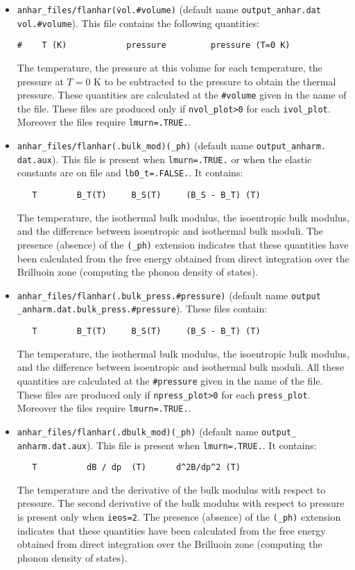 \documentclass[12pt,a4paper,twoside]{report}
\begin{document}
\begin{itemize}
\item
\texttt{anhar\_files/flanhar(\.vol.\#volume)} (default name \texttt{output\_anhar.dat} \texttt{vol.\#volume}).
This file contains the following quantities:
\begin{verbatim}
#    T (K)            pressure         pressure (T=0 K) 
\end{verbatim}
The temperature, the pressure at this volume for each temperature, the
pressure at $T=0$ K to be subtracted to the pressure to obtain the
thermal pressure.
These quantities are calculated at the \texttt{\#volume} given in the name 
of the file.
These files are produced only if \texttt{nvol\_plot>0} for each
\texttt{ivol\_plot}. Moreover the files require \texttt{lmurn=.TRUE.}.

\item \texttt{anhar\_files/flanhar(.bulk\_mod)(\_ph)} 
(default name \texttt{output\_anharm.} \texttt{dat.aux}).
This file is present when \texttt{lmurn=.TRUE.} or when the elastic
constants are on file and \texttt{lb0\_t=.FALSE.}. It contains:
\begin{verbatim}
   T        B_T(T)     B_S(T)     (B_S - B_T) (T) 
\end{verbatim}
The temperature, the isothermal bulk modulus, the isoentropic bulk modulus,
and the difference between isoentropic and isothermal bulk moduli.
The presence (absence) of the \texttt{(\_ph)} extension indicates that
these quantities have been calculated from the free energy obtained from 
direct integration over the Brilluoin zone (computing the phonon density
of states). 

\item \texttt{anhar\_files/flanhar(.bulk\_press.\#pressure)}
(default name \texttt{output} \texttt{\_anharm.dat.bulk\_press.\#pressure}).
These files contain:
\begin{verbatim}
   T        B_T(T)     B_S(T)     (B_S - B_T) (T) 
\end{verbatim}
The temperature, the isothermal bulk modulus, the isoentropic bulk modulus,
and the difference between isoentropic and isothermal bulk moduli.
All these quantities are calculated at the \texttt{\#pressure} given
in the name of the file.
These files are produced only if \texttt{npress\_plot>0} for each
\texttt{press\_plot}. Moreover the files require \texttt{lmurn=.TRUE.}.


\item \texttt{anhar\_files/flanhar(.dbulk\_mod)(\_ph)} 
(default name \texttt{output\_}\\ \texttt{anharm.dat.aux}).
This file is present when \texttt{lmurn=.TRUE.}. It contains:
\begin{verbatim}
   T          dB / dp  (T)      d^2B/dp^2 (T) 
\end{verbatim}
The temperature and the derivative of the bulk modulus with respect 
to pressure. The second derivative of the bulk modulus with respect
to pressure is present only when \texttt{ieos=2}.
The presence (absence) of the \texttt{(\_ph)} extension indicates that these 
quantities have been calculated from the free energy obtained from direct 
integration over the Brilluoin zone (computing the phonon density of states). 


\end{itemize}
\end{document}
